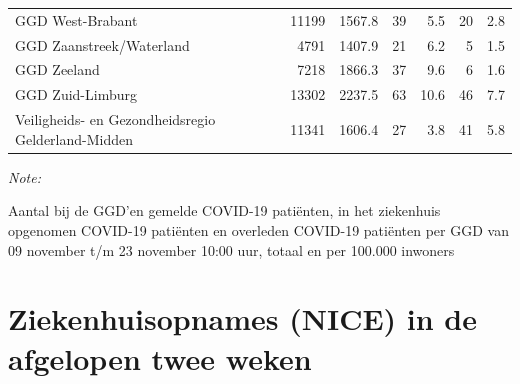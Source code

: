 \documentclass[
  english,
  man,floatsintext]{apa6}
\begin{document}
\begin{table}
\begin{threeparttable}
\begin{tabular}{lrrrrrr}
GGD West-Brabant & 11199 & 1567.8 & 39 & 5.5 & 20 & 2.8\\
GGD Zaanstreek/Waterland & 4791 & 1407.9 & 21 & 6.2 & 5 & 1.5\\
GGD Zeeland & 7218 & 1866.3 & 37 & 9.6 & 6 & 1.6\\
GGD Zuid-Limburg & 13302 & 2237.5 & 63 & 10.6 & 46 & 7.7\\
Veiligheids- en Gezondheidsregio Gelderland-Midden & 11341 & 1606.4 & 27 & 3.8 & 41 & 5.8\\
\bottomrule
\end{tabular}
\begin{tablenotes}
\item \textit{Note: } 
\item Aantal bij de GGD’en gemelde COVID-19 patiënten, in het ziekenhuis opgenomen COVID-19 patiënten en overleden COVID-19 patiënten per GGD van 09 november t/m 23 november 10:00 uur, totaal en per 100.000 inwoners
\end{tablenotes}
\end{threeparttable}
\endgroup{}
\end{table}

\newpage

\hypertarget{ziekenhuisopnames-nice-in-de-afgelopen-twee-weken}{%
\section{Ziekenhuisopnames (NICE) in de afgelopen twee weken}\label{ziekenhuisopnames-nice-in-de-afgelopen-twee-weken}}
\end{document}
